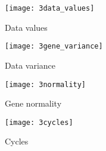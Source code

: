 \begin{figure}[h]
    \centering
    \texttt{[image: 3data\_values]}
    \caption{Data values}
    \label{fig:3:datavalues}
\end{figure}

\begin{figure}[h]
    \centering
    \texttt{[image: 3gene\_variance]}
    \caption{Data variance}
    \label{fig:3:datavariance}
\end{figure}

\begin{figure}[h]
    \centering
    \texttt{[image: 3normality]}
    \caption{Gene normality}
    \label{fig:3:normality}
\end{figure}    

\begin{figure}[h]
    \centering
    \texttt{[image: 3cycles]}
    \caption{Cycles}
    \label{fig:3:cycles}
\end{figure}    